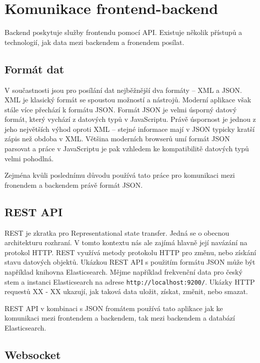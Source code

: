 \section{Komunikace frontend-backend}

Backend poskytuje služby frontendu pomocí API. Existuje několik přístupů a technologií, jak data mezi backendem a fronendem posílat.

\subsection{Formát dat}

V součastnosti jsou pro posílání dat nejběžnější dva formáty -- XML a JSON. XML je klasický formát se spoustou možností a nástrojů. Moderní aplikace však stále více přechází k formátu JSON. Formát JSON je velmi úsporný datový formát, který vychází z datových typů v JavaScriptu. Právě úspornost je jednou z jeho největších výhod oproti XML -- stejné informace mají v JSON typicky kratší zápis než obdoba v XML. Většina moderních browserů umí formát JSON parsovat a práce v JavaScriptu je pak vzhledem ke kompatibilitě datových typů velmi pohodlná.

Zejména kvůli poslednímu důvodu používá tato práce pro komunikaci mezi fronendem a backendem právě formát JSON.

\subsection{REST API}

REST je zkratka pro Representational state transfer. Jedná se o obecnou architekturu rozhraní. V tomto kontextu nás ale zajímá hlavně její navázání na protokol HTTP. REST využívá metody protokolu HTTP pro změnu, nebo získání stavu datových objektů. Ukázkou REST API s použitím formátu JSON může být například knihovna Elasticsearch. Mějme například frekvenční data pro český stem  a instanci Elasticsearch na adrese \lstinline{http://localhost:9200/}. Ukázky HTTP requestů XX - XX ukazují, jak taková data uložit, získat, změnit, nebo smazat.

REST API v kombinaci s JSON fromátem používá tato aplikace jak ke komunikaci mezi frontendem a backendem, tak mezi backendem a databází Elasticsearch.

\subsection{Websocket}

